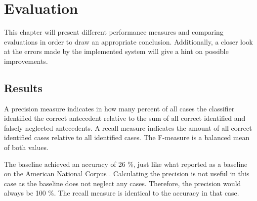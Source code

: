 \chapter{Evaluation}
\label{sec:Evaluation}

This chapter will present different performance measures and comparing evaluations in order to draw an appropriate conclusion. Additionally, a closer look at the errors made by the implemented system will give a hint on possible improvements.

\section{Results}
A precision measure indicates in how many percent of all cases the classifier identified the correct antecedent relative to the sum of all correct identified and falsely neglected antecedents. A recall measure indicates the amount of all correct identified cases relative to all identified cases. The F-measure is a balanced mean of both values.

The baseline achieved an accuracy of 26 \%, just like what \cite{bergsma2005automatic} reported as a baseline on the American National Corpus \citep{ide2001american}. Calculating the precision is not useful in this case as the baseline does not neglect any cases. Therefore, the precision would always be 100 \%. The recall measure is identical to the accuracy in that case.

\begin{table}[h]
\centering
  \caption{Pronoun resolution performance scores}
     \label{table:pronounResScores}
\end{table}


